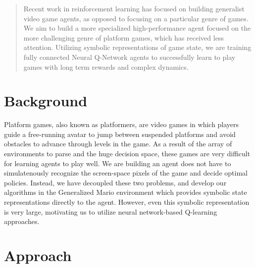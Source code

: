 \documentclass{article}
\begin{document}
 


\begin{abstract} 
Recent work in reinforcement learning has focused on building generalist video game agents, as opposed to focusing on a particular genre of games. We aim to build a more specialized high-performance agent focused on the more challenging genre of platform games, which has received less attention. Utilizing symbolic representations of game state, we are training fully connected Neural Q-Network agents to successfully learn to play games with long term rewards and complex dynamics.
\end{abstract} 



\section{Background}
Platform games, also known as platformers, are video games in which players guide a free-running avatar to jump between suspended platforms and avoid obstacles to advance through levels in the game. As a result of the array of environments to parse and the huge decision space, these games are very difficult for learning agents to play well. We are building an agent does not have to simulatenously recognize the screen-space pixels of the game and decide optimal policies. Instead, we have decoupled these two problems, and develop our algorithms in the Generalized Mario environment which provides symbolic state representations directly to the agent. However, even this symbolic representation is very large, motivating us to utilize neural network-based Q-learning approaches. 

\section{Approach}
\end{document}
